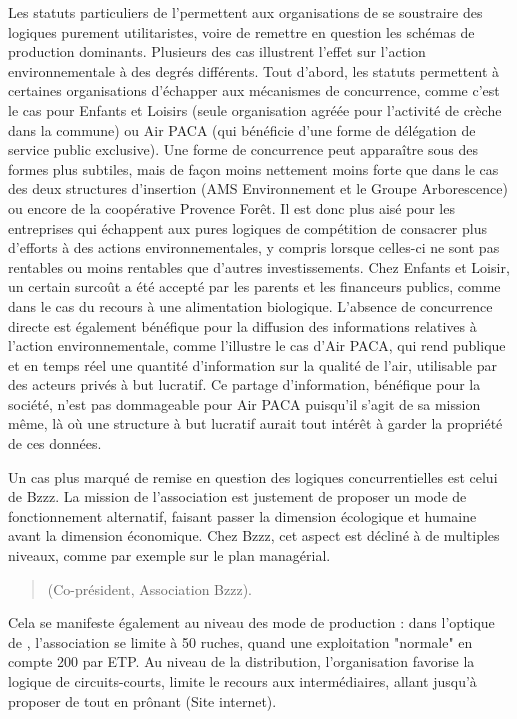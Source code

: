         Les statuts particuliers de l'\ess permettent aux organisations de se soustraire des logiques purement utilitaristes, voire de remettre en question les schémas de production dominants. Plusieurs des cas illustrent l'effet sur l'action environnementale à des degrés différents. Tout d'abord, les statuts permettent à certaines organisations d'échapper aux mécanismes de concurrence, comme c'est le cas pour Enfants et Loisirs (seule organisation agréée pour l'activité de crèche dans la commune) ou Air PACA (qui bénéficie d'une forme de délégation de service public exclusive). Une forme de concurrence peut apparaître sous des formes plus subtiles, mais de façon moins nettement moins forte que dans le cas des deux structures d'insertion (AMS Environnement et le Groupe Arborescence) ou encore de la coopérative Provence Forêt. Il est donc plus aisé pour les entreprises qui échappent aux pures logiques de compétition de consacrer plus d'efforts à des actions environnementales, y compris lorsque celles-ci ne sont pas rentables ou moins rentables que d'autres investissements. Chez Enfants et Loisir, un certain surcoût a été accepté par les parents et les financeurs publics, comme dans le cas du recours à une alimentation biologique. L'absence de concurrence directe est également bénéfique pour la diffusion des informations relatives à l'action environnementale, comme l'illustre le cas d'Air PACA, qui rend publique et en temps réel une quantité d'information sur la qualité de l'air, utilisable par des acteurs privés à but lucratif. Ce partage d'information, bénéfique pour la société, n'est pas dommageable pour Air PACA puisqu'il s'agit de sa mission même, là où une structure à but lucratif aurait tout intérêt à garder la propriété de ces données.

        Un cas plus marqué de remise en question des logiques concurrentielles est celui de Bzzz. La mission de l'association est justement de proposer un mode de fonctionnement alternatif, faisant passer la dimension écologique et humaine avant la dimension économique. Chez Bzzz, cet aspect est décliné à de multiples niveaux, comme par exemple sur le plan managérial.
        \begin{quotation}
              (Co-président, Association Bzzz).
        \end{quotation}
        Cela se manifeste également au niveau des mode de production : dans l'optique de , l'association se limite à 50 ruches, quand une exploitation "normale" en compte 200 par ETP.
        Au niveau de la distribution, l'organisation favorise la logique de circuits-courts, limite le recours aux intermédiaires, allant jusqu'à proposer de  tout en prônant  (Site internet).

